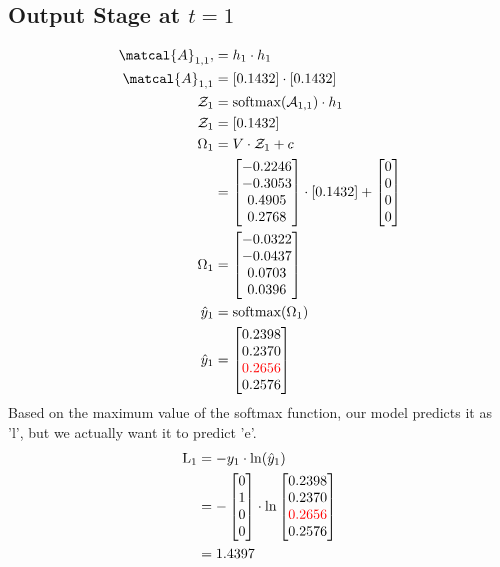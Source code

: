 \documentclass{article}
\begin{document}
\subsection*{Output Stage at $t=1$}
\begin{align*}
\matcal{A}_{1,1},&= h_1 \cdot h_1 \\
\matcal{A}_{1,1} &= [0.1432] \cdot [0.1432] \\
\mathcal{Z}_1 &= \text{softmax}(\mathcal{A}_{1,1}) \cdot h_1 \\
\mathcal{Z}_1 &= [0.1432] \\
\Omega_1 &= V \cdot \mathcal{Z}_1 + c \\
 &= \begin{bmatrix} -0.2246 \\ -0.3053 \\ 0.4905 \\ 0.2768 \end{bmatrix} \cdot [0.1432] + \begin{bmatrix} 0 \\ 0 \\ 0 \\ 0 \end{bmatrix} \\
\Omega_1 &= \begin{bmatrix} -0.0322 \\ -0.0437 \\ 0.0703 \\ 0.0396 \end{bmatrix} \\
\hat{y}_1 &= \text{softmax}(\Omega_1) \\
\hat{y}_1 &= \begin{bmatrix} 0.2398 \\ 0.2370 \\ \textcolor{red}{0.2656} \\ 0.2576 \end{bmatrix} 
\end{align*}
Based on the maximum value of the softmax function, our model predicts it as 'l', but we actually want it to predict 'e'.
\begin{align*}
    \text{L}_{1} & = -y_1 \cdot \ln(\hat{y}_1) \\
    &=-\begin{bmatrix} 0 \\ 1 \\ 0 \\ 0 \end{bmatrix} \cdot \ln{\begin{bmatrix} 0.2398 \\ 0.2370 \\ \textcolor{red}{0.2656} \\ 0.2576 \end{bmatrix}}\\
    &=1.4397
\end{align*}
\end{document}
